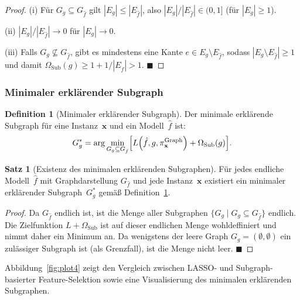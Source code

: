 ﻿\documentclass[a4paper,12pt]{article}
\theoremstyle{definition}
\newtheorem{definition}{Definition}[section]
\newtheorem{satz}{Satz}[section]
\begin{document}
\begin{proof}
  (i) Für $G_g \subseteq G_{\hat{f}}$ gilt $|E_g| \leq |E_{\hat{f}}|$, also
  $|E_g|/|E_{\hat{f}}| \in (0, 1]$ (für $|E_g| \geq 1$).

  (ii) $|E_g| / |E_{\hat{f}}| \to 0$ für $|E_g| \to 0$.

  (iii) Falls $G_g \not\subseteq G_{\hat{f}}$, gibt es mindestens eine Kante
  $e \in E_g \setminus E_{\hat{f}}$, sodass $|E_g \setminus E_{\hat{f}}| \geq 1$
  und damit $\Omega_{\mathrm{Sub}}(g) \geq 1 + 1/|E_{\hat{f}}| > 1$. \hfill$\blacksquare$
\end{proof}

\subsubsection{Minimaler erklärender Subgraph}

\begin{definition}[Minimaler erklärender Subgraph]
  \label{def:min_subgraph}
  Der minimale erklärende Subgraph für eine Instanz~$\mathbf{x}$ und ein
  Modell~$\hat{f}$ ist:
  \begin{equation}
    G^*_g = \arg\min_{\substack{G_g \subseteq G_{\hat{f}}}}
    \Bigl[
      L\!\left(\hat{f}, g, \pi_\mathbf{x}^{\mathrm{Graph}}\right) + \Omega_{\mathrm{Sub}}(g)
    \Bigr].
    \label{eq:min_subgraph}
  \end{equation}
\end{definition}

\begin{satz}[Existenz des minimalen erklärenden Subgraphen]
  Für jedes endliche Modell~$\hat{f}$ mit Graphdarstellung $G_{\hat{f}}$ und
  jede Instanz~$\mathbf{x}$ existiert ein minimaler erklärender Subgraph~$G^*_g$
  gemäß Definition~\ref{def:min_subgraph}.
\end{satz}

\begin{proof}
  Da $G_{\hat{f}}$ endlich ist, ist die Menge aller Subgraphen
  $\{G_g \mid G_g \subseteq G_{\hat{f}}\}$ endlich.
  Die Zielfunktion $L + \Omega_{\mathrm{Sub}}$ ist auf dieser endlichen Menge
  wohldeffiniert und nimmt daher ein Minimum an.
  Da wenigstens der leere Graph $G_g = (\emptyset, \emptyset)$ ein zulässiger
  Subgraph ist (als Grenzfall), ist die Menge nicht leer. \hfill$\blacksquare$
\end{proof}

Abbildung~\ref{fig:plot4} zeigt den Vergleich zwischen LASSO- und Subgraph-basierter
Feature-Selektion sowie eine Visualisierung des minimalen erklärenden Subgraphen.
\end{document}
